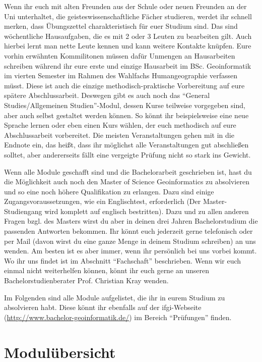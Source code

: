 Wenn ihr euch mit alten Freunden aus der Schule oder neuen Freunden an der Uni unterhaltet, die geisteswissenschaftliche Fächer studieren, werdet ihr schnell merken, dass Übungszettel charakteristisch für euer Studium sind. Das sind wöchentliche Hausaufgaben, die es mit 2 oder 3 Leuten zu bearbeiten gilt. Auch hierbei lernt man nette Leute kennen und kann weitere Kontakte knüpfen. Eure vorhin erwähnten Kommilitonen müssen dafür Unmengen an Hausarbeiten schreiben während ihr eure erste und einzige Hausarbeit im BSc. Geoinformatik im vierten Semester im Rahmen des Wahlfachs Humangeographie verfassen müsst. Diese ist auch die einzige methodisch-praktische Vorbereitung auf eure spätere Abschlussarbeit. Deswegen gibt es auch noch das "`General Studies/Allgemeinen Studien"'-Modul, dessen Kurse teilweise vorgegeben sind, aber auch selbst gestaltet werden können. So könnt ihr beispielsweise eine neue Sprache lernen oder eben einen Kurs wählen, der euch methodisch auf eure Abschlussarbeit vorbereitet. Die meisten Veranstaltungen gehen mit in die Endnote ein, das heißt, dass ihr möglichst alle Veranstaltungen gut abschließen solltet, aber andererseits fällt eine vergeigte Prüfung nicht so stark ins Gewicht.

Wenn alle Module geschafft sind und die Bachelorarbeit geschrieben ist, hast du die Möglichkeit auch noch den Master of Science Geoinformatics zu absolvieren und so eine noch höhere Qualifikation zu erlangen. Dazu sind einige Zugangsvoraussetzungen, wie ein Englischtest, erforderlich (Der Master-Studiengang wird komplett auf englisch bestritten). Dazu und zu allen anderen Fragen bzgl. des Masters wirst du aber in deinen drei Jahren Bachelorstudium die passenden Antworten bekommen. Ihr könnt euch jederzeit gerne telefonisch oder per Mail (davon wirst du eine ganze Menge in deinem Studium schreiben) an uns wenden. Am besten ist es aber immer, wenn ihr persönlich bei uns vorbei kommt. Wo ihr uns findet ist im Abschnitt "`Fachschaft"' beschrieben. Wenn wir euch einmal nicht weiterhelfen können, könnt ihr euch gerne an unseren Bachelorstudienberater Prof. Christian Kray wenden.

Im Folgenden sind alle Module aufgelistet, die ihr in eurem Studium zu absolvieren habt. Diese könnt ihr ebenfalls auf der ifgi-Webseite (\url{http://www.bachelor-geoinformatik.de/}) im Bereich "`Prüfungen"' ﬁnden.

\newpage

\section{Modulübersicht}

